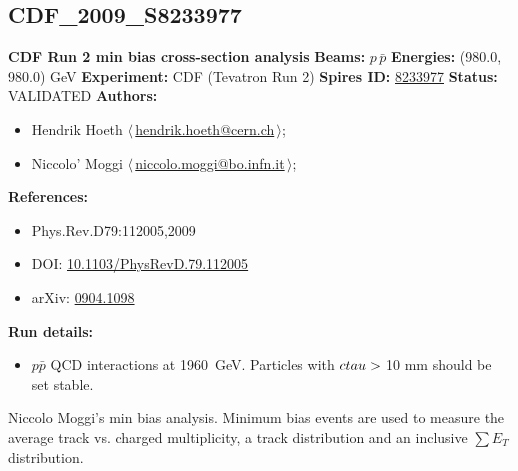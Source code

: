 \subsection[CDF\_2009\_S8233977]{CDF\_2009\_S8233977\,\cite{Aaltonen:2009ne}}
\textbf{CDF Run 2 min bias cross-section analysis}\newline
\textbf{Beams:} $p$\,$\bar{p}$ \newline
\textbf{Energies:} (980.0, 980.0) GeV \newline
\textbf{Experiment:} CDF (Tevatron Run 2) \newline
\textbf{Spires ID:} \href{http://www.slac.stanford.edu/spires/find/hep/www?rawcmd=key+8233977}{8233977}\newline
\textbf{Status:} VALIDATED\newline
\textbf{Authors:}
\begin{itemize}
  \item Hendrik Hoeth $\langle\,$\href{mailto:hendrik.hoeth@cern.ch}{hendrik.hoeth@cern.ch}$\,\rangle$;
  \item Niccolo' Moggi $\langle\,$\href{mailto:niccolo.moggi@bo.infn.it}{niccolo.moggi@bo.infn.it}$\,\rangle$;
\end{itemize}
\textbf{References:}
\begin{itemize}
  \item Phys.Rev.D79:112005,2009
  \item DOI: \href{http://dx.doi.org/10.1103/PhysRevD.79.112005}{10.1103/PhysRevD.79.112005}
  \item arXiv: \href{http://arxiv.org/abs/0904.1098}{0904.1098}
\end{itemize}
\textbf{Run details:}
\begin{itemize}

  \item $p\bar{p}$ QCD interactions at 1960~GeV. Particles with $c \\tau > {}$10 mm should be set stable.\end{itemize}

\noindent Niccolo Moggi's min bias analysis. Minimum bias events are used to measure the average track \pT vs. charged multiplicity, a track \pT distribution and an inclusive $\sum E_T$ distribution.

\clearpage


\clearpage

